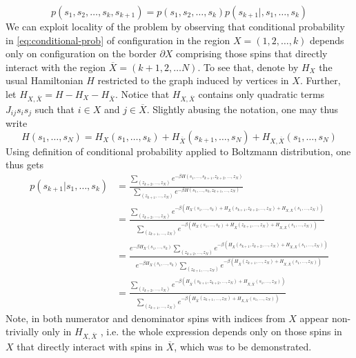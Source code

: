 \begin{equation}
  \label{eq:conditional-prob}
  p(s_1, s_2, \ldots, s_k, s_{k+1}) = p(s_1, s_2, \ldots, s_k)p(s_{k+1}|, s_1, \ldots, s_k)
\end{equation}
We can exploit locality of the problem by observing that conditional
probability in \eqref{eq:conditional-prob} of configuration in the region $X =
  (1, 2, \ldots, k)$ depends only on configuration on the border $\partial X$ comprising those spins that directly interact with the region
$\overline{X} = (k+1, 2, \ldots N)$. To see that, denote by $H_X$ the usual
Hamiltonian $H$ restricted to the graph induced by vertices in $X$. Further,
let $H_{X, \overline{X}} = H - H_X - H_{\overline{X}}$. Notice that $H_{X,
    \overline{X}}$ contains only quadratic terms $J_{ij} s_i s_j$ such that $i \in
  X$ and $j \in \overline{X}$. Slightly abusing the notation, one may thus write
\begin{equation}
  H(s_1, \ldots, s_N) = H_X(s_1, \ldots, s_k) + H_{\overline{X}}(s_{k+1}, \ldots, s_N) + H_{X, \overline{X}}(s_1, \ldots, s_N)
\end{equation}
Using definition of conditional probability applied to Boltzmann distribution,
one thus gets
\begin{align}
  p(s_{k+1}|s_1, \ldots, s_k) & = \frac{\sum\limits_{(z_{k+2}, \ldots, z_N)}e^{-\beta H(s_1, \ldots, s_{k+1}, z_{k+2},\ldots,z_N)}}{\sum\limits_{(z_{k+1}, \ldots, z_N)}e^{-\beta H(s_1, \ldots, s_k, z_{k+1},\ldots,z_N)}}                                                                                                                                                     \\
                              & = \frac{\sum\limits_{(z_{k+2}, \ldots, z_N)}e^{-\beta (H_X(s_1, \ldots, s_k) + H_{\overline{X}}(s_{k+1}, z_{k+2},\ldots,z_N) + H_{X, \overline{X}}(s_1, \ldots, z_N))}}{\sum\limits_{(z_{k+1}, \ldots, z_N)}e^{-\beta (H_X(s_1, \ldots, s_k) + H_{\overline{X}}(z_{k+1}, \ldots,z_N) + H_{X, \overline{X}}(s_1, \ldots, z_N))}}                 \\
                              & = \frac{e^{-\beta H_X(s_1, \ldots, s_k)}\sum\limits_{(z_{k+2}, \ldots, z_N)} e^{-\beta(H_{\overline{X}}(s_{k+1}, z_{k+2},\ldots,z_N) + H_{X, \overline{X}}(s_1, \ldots, z_N))}}{e^{-\beta H_X(s_1, \ldots, s_k)}\sum\limits_{(z_{k+1}, \ldots, z_N)}e^{ -\beta(H_{\overline{X}}(z_{k+1}, \ldots,z_N) + H_{X, \overline{X}}(s_1, \ldots, z_N))}} \\
                              & = \frac{\sum\limits_{(z_{k+2}, \ldots, z_N)} e^{-\beta(H_{\overline{X}}(s_{k+1}, z_{k+2},\ldots,z_N) + H_{X, \overline{X}}(s_1, \ldots, z_N))}}{\sum\limits_{(z_{k+1}, \ldots, z_N)}e^{ -\beta(H_{\overline{X}}(z_{k+1}, \ldots,z_N) + H_{X, \overline{X}}(s_1, \ldots, z_N))}}
\end{align}
Note, in both numerator and denominator spins with indices from $X$ appear
non-trivially only in $H_{X, \overline{X}}$ , i.e. the whole expression depends
only on those spins in $X$ that directly interact with spins in $\overline{X}$,
which was to be demonstrated.

